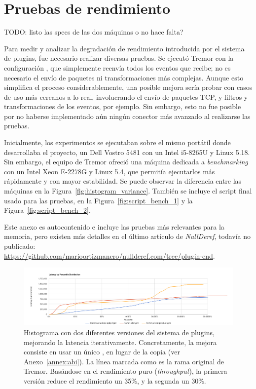 \chapter{Pruebas de rendimiento}\label{annex:benchmarks}

TODO: listo las specs de las dos máquinas o no hace falta?

Para medir y analizar la degradación de rendimiento introducida por el sistema
de plugins, fue necesario realizar diversas pruebas. Se ejecutó Tremor con la
configuración , que simplemente reenvía todos los eventos que
recibe; no es necesario el envío de paquetes ni transformaciones más complejas.
Aunque esto simplifica el proceso considerablemente, una posible mejora sería
probar con casos de uso más cercanos a lo real, involucrando el envío de
paquetes TCP, y filtros y transformaciones de los eventos, por ejemplo. Sin
embargo, esto no fue posible por no haberse implementado aún ningún conector más
avanzado al realizarse las pruebas.

Inicialmente, los experimentos se ejecutaban sobre el mismo portátil donde
desarrollaba el proyecto, un Dell Vostro 5481 con un Intel i5-8265U y Linux
5.18. Sin embargo, el equipo de Tremor ofreció una máquina dedicada a
\emph{benchmarking} con un Intel Xeon E-2278G y Linux 5.4, que permitía
ejecutarlos más rápidamente y con mayor estabilidad. Se puede observar la
diferencia entre las máquinas en la Figura~\ref{fig:histogram_variance}. También
se incluye el script final usado para las pruebas, en la
Figura~\ref{fig:script_bench_1} y la Figura~\ref{fig:script_bench_2}.

Este anexo es autocontenido e incluye las pruebas más relevantes para la
memoria, pero existen más detalles en el último artículo de \emph{NullDeref},
todavía no publicado:\\
\url{https://github.com/marioortizmanero/nullderef.com/tree/plugin-end}.

\begin{figure}
    \centering
    \includegraphics[width=\textwidth]{./Imagenes/histogram_pdk.png}
    \caption{Histograma con dos diferentes versiones del sistema de plugins,
    mejorando la latencia iterativamente. Concretamente, la mejora consiste en
    usar un único , en lugar de la copia  (ver
    Anexo~\ref{annex:abi}). La línea marcada como
     es la rama original de Tremor. Basándose en
    el rendimiento puro (\emph{throughput}), la primera versión reduce el
    rendimiento un 35\%, y la segunda un 30\%.}%
    \label{fig:histogram_pdk}
\end{figure}

